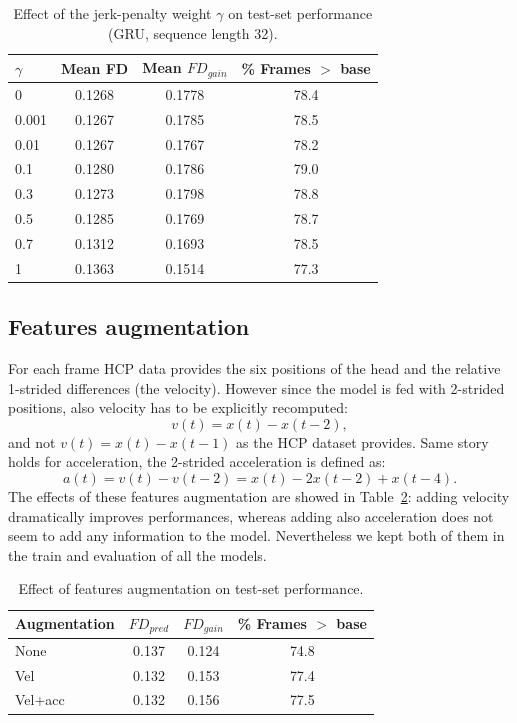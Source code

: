 \documentclass[
reprint,
aps,
prd,
superscriptaddress,
nofootinbib
]{revtex4-2}
\begin{document}
\begin{table}[ht]
\centering
\caption{Effect of the jerk-penalty weight $\gamma$ on test-set performance (GRU, sequence length 32).}
\label{tab:gamma_scan}
\small
\begin{tabular}{l c c c}
\toprule
$\gamma$ & Mean FD & Mean $FD_{gain}$ & \% Frames $>$ base \\
\midrule
0     & 0.1268 & 0.1778 & 78.4 \\
0.001 & 0.1267 & 0.1785 & 78.5 \\
0.01  & 0.1267 & 0.1767 & 78.2 \\
0.1   & 0.1280 & 0.1786 & 79.0 \\
0.3   & 0.1273 & 0.1798 & 78.8 \\
0.5   & 0.1285 & 0.1769 & 78.7 \\
0.7   & 0.1312 & 0.1693 & 78.5 \\
1     & 0.1363 & 0.1514 & 77.3 \\
\bottomrule
\end{tabular}
\end{table}

\subsection{Features augmentation}
For each frame HCP data provides the six positions of the head and the relative 1-strided differences (the velocity). However since the model is fed with 2-strided positions, also velocity has to be explicitly recomputed:
\begin{equation}
    v(t) = x(t) - x(t-2),
\end{equation}
and not $v(t) = x(t) - x(t-1)$ as the HCP dataset provides. Same story holds for acceleration, the 2-strided acceleration is defined as:
\begin{equation}
    a(t) = v(t) - v(t-2) = x(t) - 2x(t-2) + x(t-4).
\end{equation}
The effects of these features augmentation are showed in Table~\ref{tab:feat-augmentation}: adding velocity dramatically improves performances, whereas adding also acceleration does not seem to add any information to the model.
Nevertheless we kept both of them in the train and evaluation of all the models.

\begin{table}[ht]
\centering
\caption{Effect of features augmentation on test-set performance.}
\label{tab:feat-augmentation}
\small
\begin{tabular}{l c c c}
\toprule
Augmentation & $FD_{pred}$ & $FD_{gain}$ & \% Frames $>$ base \\
\midrule
None & 0.137 & 0.124 & 74.8 \\
Vel & 0.132 & 0.153 & 77.4  \\
Vel+acc & 0.132 & 0.156 & 77.5  \\
\bottomrule
\end{tabular}
\end{table}
\end{document}
